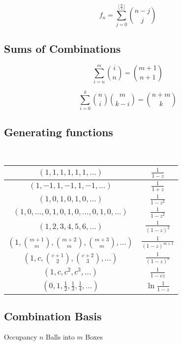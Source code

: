 \documentclass[a4paper]{amsart}
\begin{document}
\begin{equation*}
    f_n = \sum_{j = 0}^{\lfloor \frac{n}{2} \rfloor} \binom{n-j}{j}
\end{equation*}

\subsection{Sums of Combinations}

\begin{equation*}
    \sum_{i = n}^m \binom{i}{n} = \binom{m + 1}{n + 1}
\end{equation*}

\begin{equation*}
    \sum_{i = 0}^k \binom{n}{i} \binom{m}{k - i} = \binom{n + m}{k}
\end{equation*}


\subsection{Generating functions}
\ 

\begin{tabular}{|c|c|}
    \hline
    $(1,1,1,1,1,1,\ldots)$ & $\frac{1}{1-z}$ \\ \hline
    $(1,-1,1,-1,1,-1,\ldots)$ & $\frac{1}{1+z}$ \\ \hline
    $(1,0,1,0,1,0,\ldots)$ & $\frac{1}{1-z^2}$ \\ \hline
    $(1,0,\ldots,0,1,0,1,0,\ldots,0,1,0,\ldots)$ & $\frac{1}{1-z^2}$ \\ \hline
    $(1,2,3,4,5,6,\ldots)$ & $\frac{1}{(1-z)^2}$ \\ \hline
    $(1,\binom{m+1}{m},\binom{m+2}{m},\binom{m+3}{m},\ldots)$ & $\frac{1}{(1-z)^{m+1}}$ \\ \hline
    $(1,c,\binom{c+1}{2},\binom{c+2}{3},\ldots)$ & $\frac{1}{(1-z)^c}$ \\ \hline
    $(1,c,c^2, c^3, \ldots)$ & $\frac{1}{1-cz}$ \\ \hline
    $(0,1,\frac{1}{2},\frac{1}{3},\frac{1}{4},\ldots)$ & $\ln \frac{1}{1-z}$ \\ \hline
\end{tabular}

\subsection{Combination Basis}
Occupancy $n$ Balls into $m$ Boxes
\ 
\end{document}
